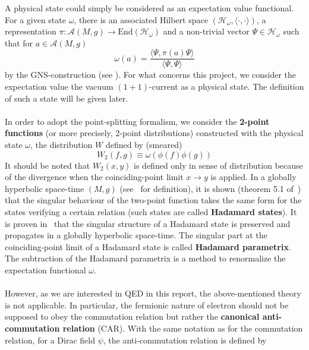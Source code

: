 A physical state could simply be considered as an expectation value functional. 
For a given state $\omega$, there is an associated Hilbert space $(\mathscr{H}_\omega, \langle \cdot, \cdot \rangle)$, a representation $\pi : \mathscr{A}(M,g)\rightarrow \mathrm{End}(\mathscr{H}_\omega)$ and a non-trivial vector $\Psi \in \mathscr{H}_\omega$ such that for $a \in \mathscr{A}(M,g)$
\begin{equation*}
\omega(a) = \frac{\langle \Psi, \pi(a)\Psi\rangle}{\langle \Psi, \Psi \rangle}
\end{equation*}
by the GNS-construction (see \eg\cite{bar2009quantum}).
For what concerns this project, we consider the expectation value the vacuum $(1+1)$-current as a physical state.
The definition of such a state will be given later. \\\\
%
In order to adopt the point-splitting formalism, 
we consider the \textbf{2-point functions} (or more precisely, 2-point distributions) constructed with the physical state $\omega$, 
\ie the distribution $W$ defined by (smeared) 
\begin{equation*}
W_2(f, g ) \equiv \omega(\phi(f) \phi(g))
\end{equation*}
It should be noted that $W_2(x,y)$ is defined only in sense of distribution because of the divergence when the coinciding-point limit $x\rightarrow y$ is applied.
In a globally hyperbolic space-time $(M,g)$ (see~\cite{Wald2010} for definition), it is shown (theorem 5.1 of~\cite{Radzikowski1996}) that the singular behaviour of the two-point function takes the same form for the states verifying a certain relation (such states are called \textbf{Hadamard states}). 
It is proven in~\cite{Fulling1978} that the singular structure of a Hadamard state is preserved and propagates in a globally hyperbolic space-time. 
The singular part at the coinciding-point limit of a Hadamard state is called \textbf{Hadamard parametrix}.
The subtraction of the Hadamard parametrix is a method to renormalize the expectation functional $\omega$. \\\\
%
However, as we are interested in QED in this report, the above-mentioned theory is not applicable. 
In particular, the fermionic nature of electron should not be supposed to obey the commutation relation but rather the \textbf{canonical anti-commutation relation} (CAR).
With the same notation as for the commutation relation, 
for a Dirac field $\psi$, the anti-commutation relation is defined by
